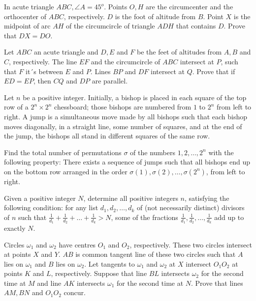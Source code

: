 \documentclass[11pt]{scrartcl}
\begin{document}
\begin{problem}[7384014966956792204]
	In acute triangle $ABC, \angle A = 45^o$. Points $O,H$ are the circumcenter and the orthocenter of $ABC$, respectively. $D$ is the foot of altitude from $B$. Point $X$ is the midpoint of arc $AH$ of the circumcircle of triangle $ADH$ that contains $D$. Prove that $DX = DO$.
\end{problem}
\begin{problem}[7412933249652771804]
Let $ABC$ an acute triangle and $D,E$ and $F$ be the feet of altitudes from $A,B$ and $C$, respectively. The line $EF$ and the circumcircle of $ABC$ intersect at $P$, such that $F$ it´s between $E$ and $P$. Lines $BP$ and $DF$ intersect at $Q$. Prove that if $ED=EP$, then $CQ$ and $DP$ are parallel.
\end{problem}
\begin{problem}[7427384519403100799]
Let $n$ be a positive integer. Initially, a bishop is placed in each square of the top row of a $2^n \times 2^n$
chessboard; those bishops are numbered from $1$ to $2^n$ from left to right. A jump is a simultaneous move made by all bishops such that each bishop moves diagonally, in a straight line, some number of squares, and at the end of the jump, the bishops all stand in different squares of the same row.

Find the total number of permutations $\sigma$ of the numbers $1, 2, \ldots, 2^n$ with the following property: There exists a sequence of jumps such that all bishops end up on the bottom row arranged in the order $\sigma(1), \sigma(2), \ldots, \sigma(2^n)$, from left to right.
\end{problem}
\begin{problem}[7431104394604748426]
Given a positive integer $N$, determine all positive integers $n$, satisfying the following condition: for any list $d_1,d_2,\ldots,d_k$ of (not necessarily distinct) divisors of $n$ such that $\frac{1}{d_1} + \frac{1}{d_2} + \ldots + \frac{1}{d_k} > N$, some of the fractions $\frac{1}{d_1}, \frac{1}{d_2}, \ldots, \frac{1}{d_k}$ add up to exactly $N$.
\end{problem}
\begin{problem}[7456007547971566183]
	Circles $\omega_1$ and $\omega_2$ have centres $O_1$ and $O_2$, respectively. These two circles intersect at points $X$ and $Y$. $AB$ is common tangent line of these two circles such that $A$ lies on $\omega_1$ and $B$ lies on $\omega_2$. Let tangents to $\omega_1$ and $\omega_2$ at $X$ intersect $O_1O_2$ at points $K$ and $L$, respectively. Suppose that line $BL$ intersects $\omega_2$ for the second time at $M$ and line $AK$ intersects $\omega_1$ for the second time at $N$. Prove that lines $AM, BN$ and $O_1O_2$ concur.
\end{problem}
\end{document}
